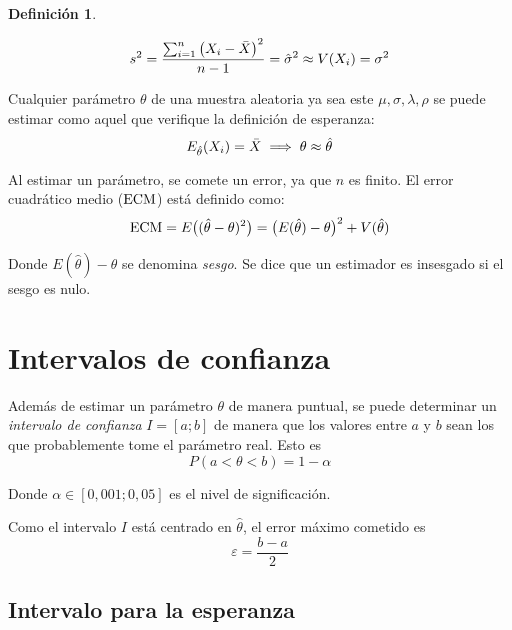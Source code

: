 \documentclass[a5paper,12pt,twoside]{book}
\newtheorem{defn}{{Definición}}[chapter]
\begin{document}
\begin{mdframed}[style=DefinitionFrame]
    \begin{defn}
    \end{defn}
    \begin{equation*}
        s^2 = \frac{\sum_{i=1}^n \left(X_i - \bar{X}\right)^2}{n-1} = \hat{\sigma}^2 \approx V(X_i) = \sigma^2 
    \end{equation*}
\end{mdframed}

Cualquier parámetro $\theta$ de una muestra aleatoria ya sea este $\mu, \sigma, \lambda, \rho$ se puede estimar como aquel que verifique la definición de esperanza:
\begin{equation*}
    E_{\hat{\theta}} (X_i) = \bar{X} \implies \theta \approx \hat{\theta}
\end{equation*}

Al estimar un parámetro, se comete un error, ya que $n$ es finito.
El error cuadrático medio ($\operatorname{ECM}$) está definido como:
\begin{equation*}
    \operatorname{ECM} = E \big( (\hat{\theta} - \theta)^2 \big)
    = \big( E(\hat{\theta})-\theta \big)^2 + V(\hat{\theta})
\end{equation*}

Donde $E(\hat{\theta})-\theta$ se denomina \emph{sesgo}.
Se dice que un estimador es insesgado si el sesgo es nulo.


\section{Intervalos de confianza}

Además de estimar un parámetro $\theta$ de manera puntual, se puede determinar un \emph{intervalo de confianza} $I=[a;b]$ de manera que los valores entre $a$ y $b$ sean los que probablemente tome el parámetro real.
Esto es
\begin{equation*}
    P(a<\theta<b) = 1 - \alpha
\end{equation*}

Donde $\alpha \in [0,001 ; 0,05]$ es el nivel de significación.

Como el intervalo $I$ está centrado en $\hat{\theta}$, el error máximo cometido es
\begin{equation*}
    \varepsilon = \frac{b-a}{2}
\end{equation*}


\subsection{Intervalo para la esperanza}
\end{document}
